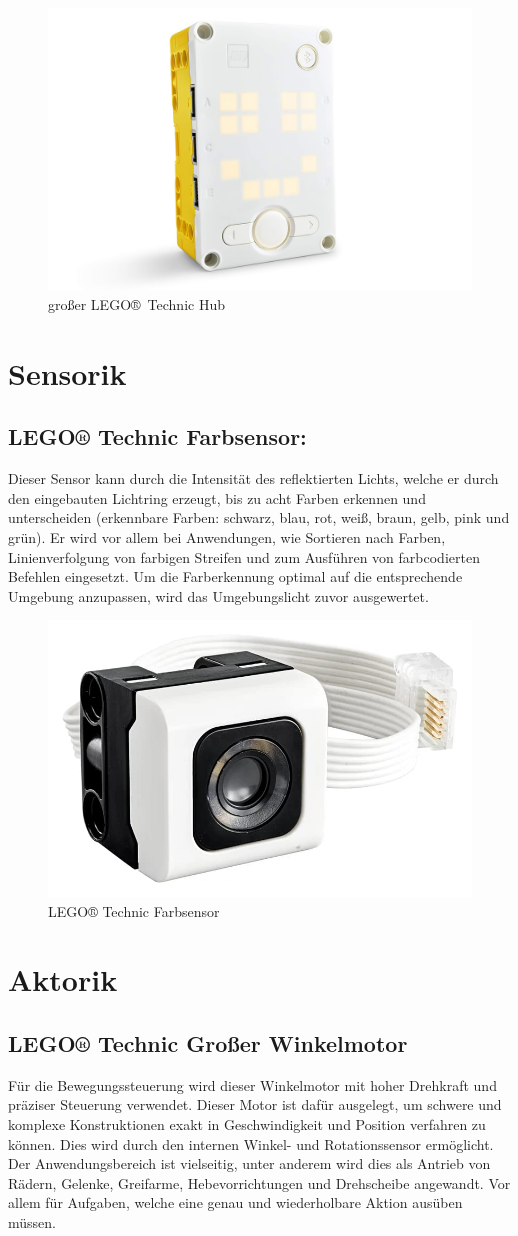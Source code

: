 \begin{figure}[H]
	\centering
	\includegraphics[width=0.4\linewidth]{images/Hub}
	\caption{großer LEGO® Technic Hub}
	\label{fig:hub}
\end{figure}



\section{Sensorik}
\subsection*{LEGO® Technic Farbsensor:}
Dieser Sensor kann durch die Intensität des reflektierten Lichts, welche er durch den eingebauten Lichtring erzeugt, bis zu acht Farben erkennen und unterscheiden (erkennbare Farben: schwarz, blau, rot, weiß, braun, gelb, pink und grün).  Er wird vor allem bei Anwendungen, wie Sortieren nach Farben, Linienverfolgung von farbigen Streifen und zum Ausführen von farbcodierten Befehlen eingesetzt. Um die Farberkennung optimal auf die entsprechende Umgebung anzupassen, wird das Umgebungslicht zuvor ausgewertet.

\begin{figure}[H]
	\centering
	\includegraphics[width=0.4\linewidth]{images/Farbsensor}
	\caption{LEGO® Technic Farbsensor}
	\label{fig:farbsensor}
\end{figure}


\section{Aktorik}
\subsection{LEGO® Technic Großer Winkelmotor}
Für die Bewegungssteuerung wird dieser Winkelmotor mit hoher Drehkraft und präziser Steuerung verwendet. Dieser Motor ist dafür ausgelegt, um schwere und komplexe Konstruktionen exakt in Geschwindigkeit und Position verfahren zu können. Dies wird durch den internen Winkel- und Rotationssensor ermöglicht. Der Anwendungsbereich ist vielseitig, unter anderem wird dies als Antrieb von Rädern, Gelenke, Greifarme, Hebevorrichtungen und Drehscheibe angewandt. Vor allem für Aufgaben, welche eine genau und wiederholbare Aktion ausüben müssen.

